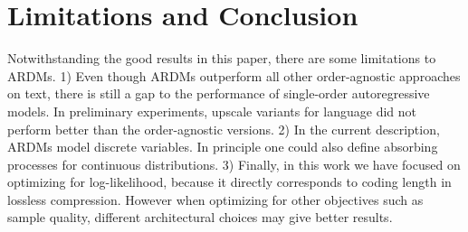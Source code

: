 \documentclass{article} \usepackage{iclr2022_conference,times}
\begin{document}
\section{Limitations and Conclusion}
Notwithstanding the good results in this paper, there are some limitations to ARDMs. 1) Even though ARDMs outperform all other order-agnostic approaches on text, there is still a gap to the performance of single-order autoregressive models. In preliminary experiments, upscale variants for language did not perform better than the order-agnostic versions. 2) In the current description, ARDMs model discrete variables. In principle one could also define absorbing processes for continuous distributions. 3) Finally, in this work we have focused on optimizing for log-likelihood, because it directly corresponds to coding length in lossless compression. However when optimizing for other objectives such as sample quality, different architectural choices may give better results.
\end{document}
